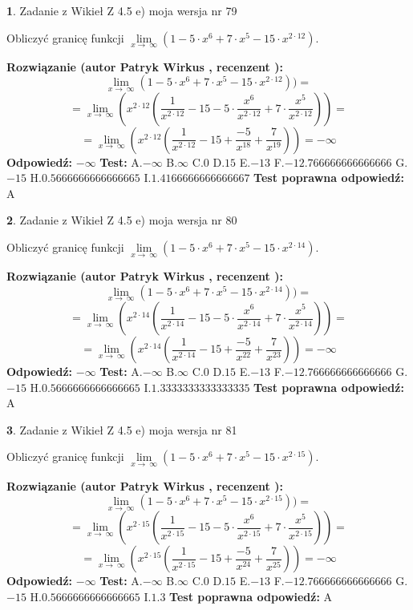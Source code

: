 \documentclass[12pt, a4paper]{article}
\theoremstyle{definition} %
\newtheorem{zad}{}
\newcommand{\zadStart}[1]{\begin{zad}#1\newline}
\newcommand{\zadStop}{\end{zad}}
\newcommand{\rozwStart}[2]{\noindent \textbf{Rozwiązanie (autor #1 , recenzent #2): }\newline}
\newcommand{\rozwStop}{\newline}
\newcommand{\odpStart}{\noindent \textbf{Odpowiedź:}\newline}
\newcommand{\odpStop}{\newline}
\newcommand{\testStart}{\noindent \textbf{Test:}\newline}
\newcommand{\testStop}{\newline}
\newcommand{\kluczStart}{\noindent \textbf{Test poprawna odpowiedź:}\newline}
\newcommand{\kluczStop}{\newline}
\begin{document}
\zadStart{Zadanie z Wikieł Z 4.5 e) moja wersja nr 79}


Obliczyć granicę funkcji  $\lim\limits_{x\to\ \infty}(1 - 5 \cdot x^{6}+7 \cdot x^{5}- 15 \cdot x^{2\cdot12})$.
\zadStop
\rozwStart{Patryk Wirkus}{}
$$\lim\limits_{x\to\ \infty}(1 - 5 \cdot x^{6}+7 \cdot x^{5}- 15 \cdot x^{2\cdot12}))=$$
$$=\lim\limits_{x\to\ \infty}(x^{2\cdot12}(\frac{1}{x^{2\cdot12}}-15 -5 \cdot \frac{x^{6}}{x^{2\cdot12}}+7 \cdot \frac{x^{5}}{x^{2\cdot12}}))=$$
$$=\lim\limits_{x\to\ \infty}(x^{2\cdot12}(\frac{1}{x^{2\cdot12}}-15 + \frac{-5}{x^{18}}+ \frac{7}{x^{19}}))=-\infty$$
\rozwStop
\odpStart
$-\infty$
\odpStop
\testStart
A.$-\infty$ B.$\infty$ C.$0$ D.$15$ E.$-13$
F.$-12.766666666666666$ G.$-15$
H.$0.5666666666666665$
I.$1.4166666666666667$
\testStop
\kluczStart
A
\kluczStop



\zadStart{Zadanie z Wikieł Z 4.5 e) moja wersja nr 80}


Obliczyć granicę funkcji  $\lim\limits_{x\to\ \infty}(1 - 5 \cdot x^{6}+7 \cdot x^{5}- 15 \cdot x^{2\cdot14})$.
\zadStop
\rozwStart{Patryk Wirkus}{}
$$\lim\limits_{x\to\ \infty}(1 - 5 \cdot x^{6}+7 \cdot x^{5}- 15 \cdot x^{2\cdot14}))=$$
$$=\lim\limits_{x\to\ \infty}(x^{2\cdot14}(\frac{1}{x^{2\cdot14}}-15 -5 \cdot \frac{x^{6}}{x^{2\cdot14}}+7 \cdot \frac{x^{5}}{x^{2\cdot14}}))=$$
$$=\lim\limits_{x\to\ \infty}(x^{2\cdot14}(\frac{1}{x^{2\cdot14}}-15 + \frac{-5}{x^{22}}+ \frac{7}{x^{23}}))=-\infty$$
\rozwStop
\odpStart
$-\infty$
\odpStop
\testStart
A.$-\infty$ B.$\infty$ C.$0$ D.$15$ E.$-13$
F.$-12.766666666666666$ G.$-15$
H.$0.5666666666666665$
I.$1.3333333333333335$
\testStop
\kluczStart
A
\kluczStop



\zadStart{Zadanie z Wikieł Z 4.5 e) moja wersja nr 81}


Obliczyć granicę funkcji  $\lim\limits_{x\to\ \infty}(1 - 5 \cdot x^{6}+7 \cdot x^{5}- 15 \cdot x^{2\cdot15})$.
\zadStop
\rozwStart{Patryk Wirkus}{}
$$\lim\limits_{x\to\ \infty}(1 - 5 \cdot x^{6}+7 \cdot x^{5}- 15 \cdot x^{2\cdot15}))=$$
$$=\lim\limits_{x\to\ \infty}(x^{2\cdot15}(\frac{1}{x^{2\cdot15}}-15 -5 \cdot \frac{x^{6}}{x^{2\cdot15}}+7 \cdot \frac{x^{5}}{x^{2\cdot15}}))=$$
$$=\lim\limits_{x\to\ \infty}(x^{2\cdot15}(\frac{1}{x^{2\cdot15}}-15 + \frac{-5}{x^{24}}+ \frac{7}{x^{25}}))=-\infty$$
\rozwStop
\odpStart
$-\infty$
\odpStop
\testStart
A.$-\infty$ B.$\infty$ C.$0$ D.$15$ E.$-13$
F.$-12.766666666666666$ G.$-15$
H.$0.5666666666666665$
I.$1.3$
\testStop
\kluczStart
A
\kluczStop
\end{document}
